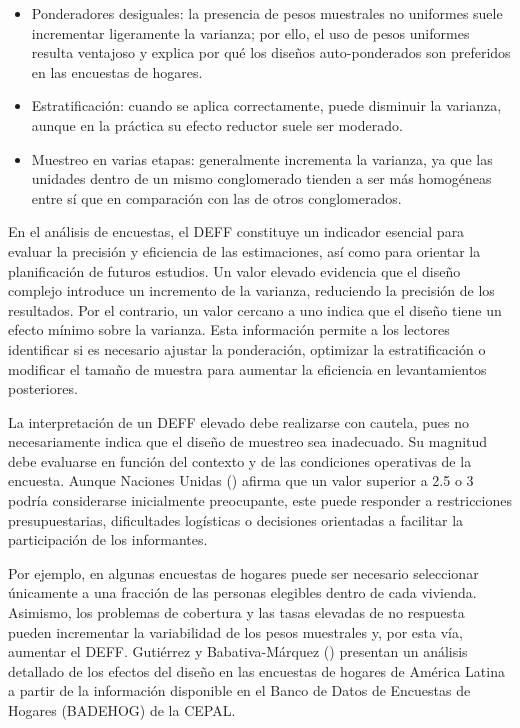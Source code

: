 \documentclass[
  spanish,
  11pt,
  letterpaper,
  oneside,
  open=any]{scrbook}
\providecommand{\tightlist}{%
  \setlength{\itemsep}{0pt}\setlength{\parskip}{0pt}}
\begin{document}
\begin{itemize}
\tightlist
\item
  Ponderadores desiguales: la presencia de pesos muestrales no uniformes
  suele incrementar ligeramente la varianza; por ello, el uso de pesos
  uniformes resulta ventajoso y explica por qué los diseños
  auto-ponderados son preferidos en las encuestas de hogares.
\item
  Estratificación: cuando se aplica correctamente, puede disminuir la
  varianza, aunque en la práctica su efecto reductor suele ser moderado.
\item
  Muestreo en varias etapas: generalmente incrementa la varianza, ya que
  las unidades dentro de un mismo conglomerado tienden a ser más
  homogéneas entre sí que en comparación con las de otros conglomerados.
\end{itemize}

En el análisis de encuestas, el DEFF constituye un indicador esencial
para evaluar la precisión y eficiencia de las estimaciones, así como
para orientar la planificación de futuros estudios. Un valor elevado
evidencia que el diseño complejo introduce un incremento de la varianza,
reduciendo la precisión de los resultados. Por el contrario, un valor
cercano a uno indica que el diseño tiene un efecto mínimo sobre la
varianza. Esta información permite a los lectores identificar si es
necesario ajustar la ponderación, optimizar la estratificación o
modificar el tamaño de muestra para aumentar la eficiencia en
levantamientos posteriores.

La interpretación de un DEFF elevado debe realizarse con cautela, pues
no necesariamente indica que el diseño de muestreo sea inadecuado. Su
magnitud debe evaluarse en función del contexto y de las condiciones
operativas de la encuesta. Aunque Naciones Unidas
() afirma que un valor superior a
2.5 o 3 podría considerarse inicialmente preocupante, este puede
responder a restricciones presupuestarias, dificultades logísticas o
decisiones orientadas a facilitar la participación de los informantes.

Por ejemplo, en algunas encuestas de hogares puede ser necesario
seleccionar únicamente a una fracción de las personas elegibles dentro
de cada vivienda. Asimismo, los problemas de cobertura y las tasas
elevadas de no respuesta pueden incrementar la variabilidad de los pesos
muestrales y, por esta vía, aumentar el DEFF. Gutiérrez y
Babativa-Márquez () presentan
un análisis detallado de los efectos del diseño en las encuestas de
hogares de América Latina a partir de la información disponible en el
Banco de Datos de Encuestas de Hogares (BADEHOG) de la CEPAL.
\end{document}
